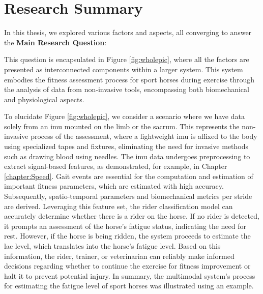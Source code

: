 \section{Research Summary}

In this thesis, we explored various factors and aspects, all converging to answer the \textbf{Main Research Question}:

\mainrq

This question is encapsulated in Figure \ref{fig:wholepic}, where all the factors are presented as interconnected components within a larger system. This system embodies the fitness assessment process for sport horses during exercise through the analysis of data from non-invasive tools, encompassing both biomechanical and physiological aspects.

To elucidate Figure \ref{fig:wholepic}, we consider a scenario where we have data solely from an \gls{imu} mounted on the limb or the sacrum. This represents the non-invasive process of the assessment, where a lightweight \gls{imu} is affixed to the body using specialized tapes and fixtures, eliminating the need for invasive methods such as drawing blood using needles. The \gls{imu} data undergoes preprocessing to extract signal-based features, as demonstrated, for example, in Chapter \ref{chapter:Speed}. Gait events are essential for the computation and estimation of important fitness parameters, which are estimated with high accuracy. Subsequently, spatio-temporal parameters and biomechanical metrics per stride are derived. Leveraging this feature set, the rider classification model can accurately determine whether there is a rider on the horse. If no rider is detected, it prompts an assessment of the horse's fatigue status, indicating the need for rest. However, if the horse is being ridden, the system proceeds to estimate the \gls{lac} level, which translates into the horse's fatigue level. Based on this information, the rider, trainer, or veterinarian can reliably make informed decisions regarding whether to continue the exercise for fitness improvement or halt it to prevent potential injury. In summary, the multimodal system's process for estimating the fatigue level of sport horses was illustrated using an example.

